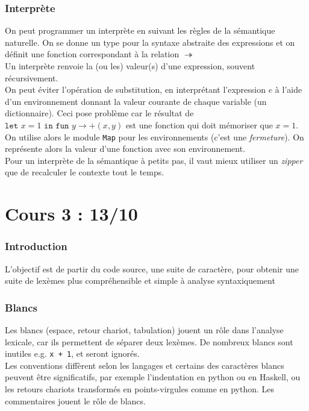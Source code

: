 \documentclass{cours}
\begin{document}
\section{Interprète}
    On peut programmer un interprète en suivant les règles de la sémantique naturelle. On se donne un type pour la syntaxe abstraite des expressions et on définit une fonction correspondant à la relation $\twoheadrightarrow$\\
    Un interprète renvoie la (ou les) valeur(s) d'une expression, souvent récursivement.\\
    On peut éviter l'opération de substitution, en interprétant l'expression $e$ à l'aide d'un environnement donnant la valeur courante de chaque variable (un dictionnaire). Ceci pose problème car le résultat de $\texttt{let } x = 1 \texttt{ in fun } y \rightarrow +(x, y)$ est une fonction qui doit \og mémoriser \fg que $x = 1$.\\
    On utilise alors le module \texttt{Map} pour les environnements (c'est une \textit{fermeture}). On représente alors la valeur d'une fonction avec son environnement. \\
    Pour un interprète de la sémantique à petits pas, il vaut mieux utiliser un \textit{zipper} que de recalculer le contexte tout le temps. 

\newpage
\part[Analyse Lexicale]{Cours 3 : 13/10}
\localtableofcontents
\section*{Introduction}
L'objectif est de partir du code source, une suite de caractère, pour obtenir une suite de lexèmes plus compréhensible et simple à analyse syntaxiquement

\section{Blancs}
Les blancs (espace, retour chariot, tabulation) jouent un rôle dans l'analyse lexicale, car ils permettent de séparer deux lexèmes. De nombreux blancs sont inutiles e.g. \texttt{x + 1}, et seront ignorés.\\
Les conventions diffèrent selon les langages et certains des caractères blancs peuvent être significatifs, par exemple l'indentation en python ou en Haskell, ou les retours chariots transformés en points-virgules comme en python. Les commentaires jouent le rôle de blancs.
\end{document}
